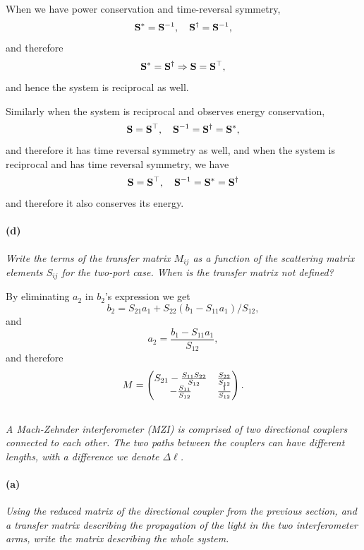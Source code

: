 \documentclass[hyperref, a4paper]{article}
\begin{document}
When we have power conservation and time-reversal symmetry, 
\[
    \vb{S}^* = \vb{S}^{-1}, \quad \vb{S}^\dagger = \vb{S}^{-1},
\]
and therefore 
\begin{equation}
    \vb{S}^* = \vb{S}^\dagger \Rightarrow \vb{S} = \vb{S}^\top,
\end{equation}
and hence the system is reciprocal as well.

Similarly  when the system is reciprocal and observes energy conservation, 
\[
    \vb{S} = \vb{S}^\top, \quad \vb{S}^{-1} = \vb{S}^\dagger = \vb{S}^*, 
\]
and therefore it has time reversal symmetry as well, 
and when the system is reciprocal and has time reversal symmetry, we have 
\[
    \vb{S} = \vb{S}^\top, \quad \vb{S}^{-1} = \vb{S}^* = \vb{S}^\dagger
\]
and therefore it also conserves its energy.

\paragraph*{(d)} \textit{Write the terms of the transfer matrix $M_{i j}$ as a function of the scattering matrix elements $S_{i j}$ for the two-port case. When is the transfer matrix not defined?} 

By eliminating $a_2$ in $b_2$'s expression we get 
\[
    b_2 = S_{21} a_1 + S_{22} (b_1 - S_{11} a_1) / S_{12},
\]
and 
\[
    a_2 = \frac{b_1 - S_{11} a_1}{S_{12}},
\]
and therefore 
\begin{equation}
    M = \pmqty{
        S_{21} - \frac{S_{11} S_{22}}{S_{12}}  & \frac{S_{22}}{S_{12}} \\
        - \frac{S_{11}}{S_{12}} & \frac{1}{S_{12}} \\
    }.
\end{equation}

\subsection{}

\textit{A Mach-Zehnder interferometer (MZI) is comprised of two directional couplers connected to each other. The two paths between the couplers can have different lengths, with a difference we denote $\Delta \ell$.}

\paragraph*{(a)} \textit{Using the reduced matrix of the directional coupler from the previous section, and a transfer matrix describing the propagation of the light in the two interferometer arms, write the matrix describing the whole system.} 
\end{document}
